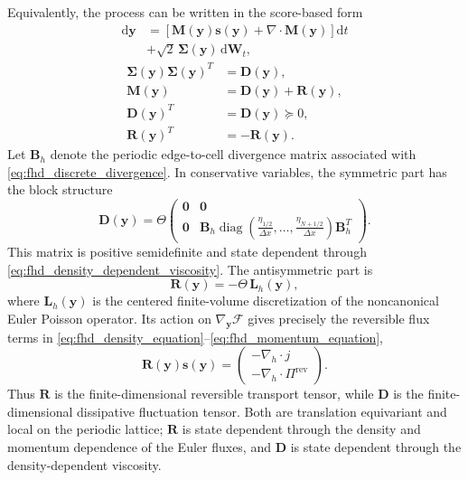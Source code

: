 \documentclass[11pt,twoside,fleqn]{article}
\renewcommand{\d}{\mathrm{d}}
\begin{document}
Equivalently, the process can be written in the score-based form
\begin{align}
    \d\bm{y}
    &=
    \left[
        \bm{M}(\bm{y})\bm{s}(\bm{y})
        +
        \nabla\cdot\bm{M}(\bm{y})
    \right]\d t
    \\
    &+
    \sqrt{2}\,
    \bm{\Sigma}(\bm{y})\,\d\bm{W}_t,
    \label{eq:fhd_score_form_sde}
\end{align}
\begin{align}
    \bm{\Sigma}(\bm{y})\bm{\Sigma}(\bm{y})^T
    &=
    \bm{D}(\bm{y}),
    \\
    \bm{M}(\bm{y})
    &=
    \bm{D}(\bm{y})+\bm{R}(\bm{y}),
    \\
    \bm{D}(\bm{y})^T
    &=
    \bm{D}(\bm{y})\succeq0,
    \\
    \bm{R}(\bm{y})^T
    &=
    -\bm{R}(\bm{y}).
    \label{eq:fhd_mobility_decomposition}
\end{align}
Let \(\bm{B}_h\) denote the periodic edge-to-cell divergence matrix associated
with \eqref{eq:fhd_discrete_divergence}. In conservative variables, the
symmetric part has the block structure
\begin{equation}
    \bm{D}(\bm{y})
    =
    \Theta
    \begin{pmatrix}
        \bm{0} & \bm{0}\\
        \bm{0} &
        \bm{B}_h
        \operatorname{diag}
        \left(
            \frac{\eta_{1/2}}{\Delta x},
            \ldots,
            \frac{\eta_{N+1/2}}{\Delta x}
        \right)
        \bm{B}_h^T
    \end{pmatrix}.
    \label{eq:fhd_symmetric_mobility}
\end{equation}
This matrix is positive semidefinite and state dependent through
\eqref{eq:fhd_density_dependent_viscosity}. The antisymmetric part is
\begin{equation}
    \bm{R}(\bm{y})
    =
    -\Theta\,\bm{L}_h(\bm{y}),
    \label{eq:fhd_antisymmetric_mobility}
\end{equation}
where \(\bm{L}_h(\bm{y})\) is the centered finite-volume discretization of the
noncanonical Euler Poisson operator. Its action on
\(\nabla_{\bm{y}}\mathcal{F}\) gives precisely the reversible flux terms in
\eqref{eq:fhd_density_equation}--\eqref{eq:fhd_momentum_equation},
\begin{equation}
    \bm{R}(\bm{y})\bm{s}(\bm{y})
    =
    \begin{pmatrix}
        -\nabla_h\cdot j\\
        -\nabla_h\cdot\Pi^{\mathrm{rev}}
    \end{pmatrix}.
    \label{eq:fhd_reversible_score_action}
\end{equation}
Thus \(\bm{R}\) is the finite-dimensional reversible transport tensor, while
\(\bm{D}\) is the finite-dimensional dissipative fluctuation tensor. Both are
translation equivariant and local on the periodic lattice; \(\bm{R}\) is
state dependent through the density and momentum dependence of the Euler fluxes,
and \(\bm{D}\) is state dependent through the density-dependent viscosity.
\end{document}
